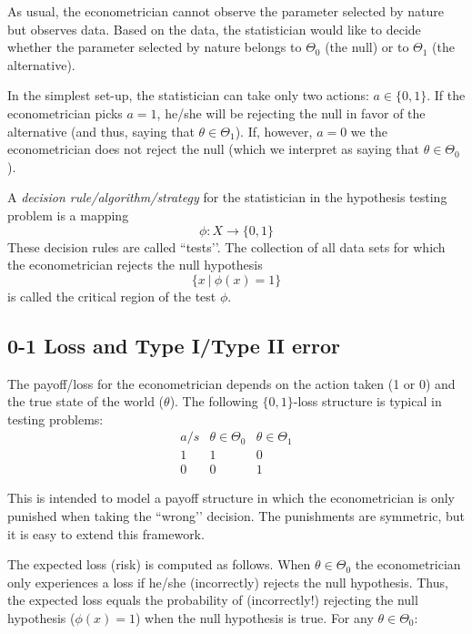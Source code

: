 \documentclass[11pt]{article} %
\begin{document}
As usual, the econometrician cannot observe the parameter selected by nature but observes data. Based on the data, the statistician would like to decide whether the parameter selected by nature belongs to $\Theta_0$ (the null) or to $\Theta_1$ (the alternative). 

In the simplest set-up, the statistician can take only two actions: $a \in \{0,1\}$. If the econometrician picks $a=1$, he/she will be rejecting the null in favor of the alternative (and thus, saying that $\theta \in \Theta_1$). If, however, $a=0$ we the econometrician does not reject the null (which we interpret as saying that $\theta \in \Theta_0$).  

A \emph{decision rule/algorithm/strategy} for the statistician in the hypothesis testing problem is a mapping
\begin{equation*}
\phi:X \rightarrow \{0,1\}
\end{equation*}
These decision rules are called ``tests’’. The collection of all data sets for which the econometrician rejects the null hypothesis 
$$\{x \: | \: \phi(x)=1\} $$
\noindent is called the critical region of the test $\phi$. \\


\subsection{0-1 Loss and Type I/Type II error}

The payoff/loss for the econometrician depends on the action taken (1 or 0) and the true state of the world ($\theta$). The following $\{0,1\}$-loss structure is typical in testing problems:
\begin{equation*}
\left.\begin{array}{ccc} a/s& \theta \in \Theta_0 & \theta \in \Theta_1 \\ 1 & 1 & 0 \\0 & 0 & 1\end{array}\right.
\end{equation*}

This is intended to model a payoff structure in which the econometrician is only punished when taking the ``wrong’’ decision. The punishments are symmetric, but it is easy to extend this framework. 

The expected loss (risk) is computed as follows. When $\theta \in \Theta_0$ the econometrician only experiences a loss if he/she (incorrectly) rejects the null hypothesis. Thus, the expected loss equals the probability of (incorrectly!) rejecting the null hypothesis ($\phi(x)=1$) when the null hypothesis is true. For any $\theta \in \Theta_0:$ 
\end{document}
